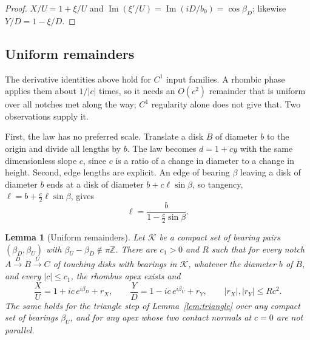 \documentclass[11pt]{amsart}
\newtheorem{lemma}{Lemma}[section]
\theoremstyle{definition}
\DeclareMathOperator{\Imag}{Im}
\begin{document}
\begin{proof}
$X/U=1+\xi/U$ and $\Imag(\xi'/U)=\Imag(iD/b_0)=\cos\beta_D$; likewise $Y/D=1-\xi/D$.
\end{proof}

\subsection{Uniform remainders}
The derivative identities above hold for $C^1$ input families. A rhombic phase applies them about
$1/|c|$ times, so it needs an $O(c^2)$ remainder that is uniform over all notches met along the way;
$C^1$ regularity alone does not give that. Two observations supply it.

First, the law has no preferred scale. Translate a disk $B$ of diameter $b$ to the origin and divide
all lengths by $b$. The law becomes $d=1+cy$ with the same dimensionless slope $c$, since $c$ is a
ratio of a change in diameter to a change in height. Second, edge lengths are explicit. An edge of
bearing $\beta$ leaving a disk of diameter $b$ ends at a disk of diameter $b+c\ell\sin\beta$, so
tangency, $\ell=b+\tfrac c2\ell\sin\beta$, gives
\begin{equation}\label{eq:edge-exact}
\ell=\frac{b}{1-\frac c2\sin\beta}.
\end{equation}

\begin{lemma}[Uniform remainders]\label{lem:uniform}
Let $\mathcal K$ be a compact set of bearing pairs $(\beta_D,\beta_U)$ with $\beta_U-\beta_D\notin\pi\mathbb Z$.
There are $c_1>0$ and $R$ such that for every notch $A\xrightarrow{D}B\xrightarrow{U}C$ of touching disks
with bearings in $\mathcal K$, whatever the diameter $b$ of $B$, and every $|c|\le c_1$, the rhombus apex
exists and
\[
\frac XU=1+ic\,e^{i\beta_D}+r_X,\qquad \frac YD=1-ic\,e^{i\beta_U}+r_Y,\qquad |r_X|,|r_Y|\le Rc^2.
\]
The same holds for the triangle step of Lemma~\ref{lem:triangle} over any compact set of bearings
$\beta_U$, and for any apex whose two contact normals at $c=0$ are not parallel.
\end{lemma}
\end{document}
